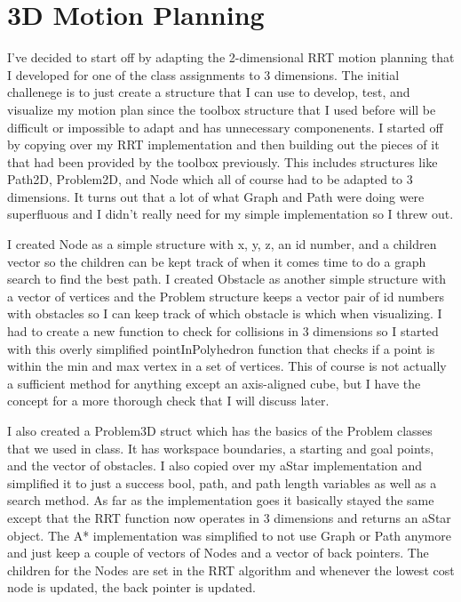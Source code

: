\documentclass{article}
\begin{document}
\section*{3D Motion Planning}

I've decided to start off by adapting the 2-dimensional RRT motion planning that I developed for one of the class assignments to 3 dimensions.
The initial challenege is to just create a structure that I can use to develop, test, and visualize my motion plan since the toolbox structure that I used before will be difficult or impossible to adapt and has unnecessary componenents.
I started off by copying over my RRT implementation and then building out the pieces of it that had been provided by the toolbox previously.
This includes structures like Path2D, Problem2D, and Node which all of course had to be adapted to 3 dimensions.
It turns out that a lot of what Graph and Path were doing were superfluous and I didn't really need for my simple implementation so I threw out.

I created Node as a simple structure with x, y, z, an id number, and a children vector so the children can be kept track of when it comes time to do a graph search to find the best path.
I created Obstacle as another simple structure with a vector of vertices and the Problem structure keeps a vector pair of id numbers with obstacles so I can keep track of which obstacle is which when visualizing.
I had to create a new function to check for collisions in 3 dimensions so I started with this overly simplified pointInPolyhedron function that checks if a point is within the min and max vertex in a set of vertices.
This of course is not actually a sufficient method for anything except an axis-aligned cube, but I have the concept for a more thorough check that I will discuss later.

I also created a Problem3D struct which has the basics of the Problem classes that we used in class.
It has workspace boundaries, a starting and goal points, and the vector of obstacles.
I also copied over my aStar implementation and simplified it to just a success bool, path, and path length variables as well as a search method.
As far as the implementation goes it basically stayed the same except that the RRT function now operates in 3 dimensions and returns an aStar object.
The A* implementation was simplified to not use Graph or Path anymore and just keep a couple of vectors of Nodes and a vector of back pointers.
The children for the Nodes are set in the RRT algorithm and whenever the lowest cost node is updated, the back pointer is updated.
\end{document}
